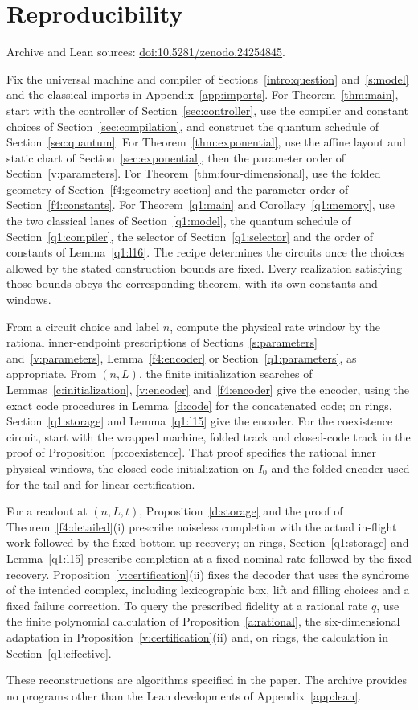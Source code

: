 \section{Reproducibility}\label{app:reproducibility}
Archive and Lean sources:
\href{https://doi.org/10.5281/zenodo.24254845}{doi:10.5281/zenodo.24254845}.

Fix the universal machine and compiler of Sections~\ref{intro:question} and~\ref{s:model}
and the classical imports in Appendix~\ref{app:imports}. For Theorem~\ref{thm:main},
start with the controller of Section~\ref{sec:controller}, use the
compiler and constant choices of Section~\ref{sec:compilation}, and
construct the quantum schedule of Section~\ref{sec:quantum}. For
Theorem~\ref{thm:exponential}, use the affine layout and static chart of
Section~\ref{sec:exponential}, then the parameter order of
Section~\ref{v:parameters}. For Theorem~\ref{thm:four-dimensional}, use the folded geometry of
Section~\ref{f4:geometry-section} and the parameter order of
Section~\ref{f4:constants}. For Theorem~\ref{q1:main} and Corollary~\ref{q1:memory}, use the two classical lanes of
Section~\ref{q1:model}, the quantum schedule of Section~\ref{q1:compiler}, the selector of
Section~\ref{q1:selector} and the order of constants of Lemma~\ref{q1:l16}. The recipe determines the circuits once
the choices allowed by the stated construction bounds are fixed.
Every realization satisfying those bounds obeys the corresponding theorem, with its own constants and windows.

From a circuit choice and label \(n\), compute the physical rate window
by the rational inner-endpoint prescriptions of
Sections~\ref{s:parameters} and~\ref{v:parameters}, Lemma~\ref{f4:encoder}
or Section~\ref{q1:parameters}, as appropriate. From \((n,L)\), the finite initialization searches of
Lemmas~\ref{c:initialization}, \ref{v:encoder} and~\ref{f4:encoder}
give the encoder, using the exact code procedures in Lemma~\ref{d:code}
for the concatenated code; on rings, Section~\ref{q1:storage} and
Lemma~\ref{q1:l15} give the encoder. For the coexistence circuit, start with
the wrapped machine, folded track and closed-code track in the proof
of Proposition~\ref{p:coexistence}. That proof specifies the rational
inner physical windows, the closed-code initialization on \(I_0\)
and the folded encoder used for the tail and for linear certification.

For a readout at \((n,L,t)\), Proposition~\ref{d:storage} and the
proof of Theorem~\ref{f4:detailed}(i) prescribe noiseless completion
with the actual in-flight work followed by the fixed bottom-up recovery;
on rings, Section~\ref{q1:storage} and Lemma~\ref{q1:l15} prescribe completion
at a fixed nominal rate followed by the fixed recovery.
Proposition~\ref{v:certification}(ii) fixes the decoder that uses the
syndrome of the intended complex, including lexicographic box, lift and filling choices and
a fixed failure correction. To query the prescribed fidelity at a
rational rate \(q\), use the finite polynomial calculation of
Proposition~\ref{a:rational}, the six-dimensional adaptation in
Proposition~\ref{v:certification}(ii) and, on rings, the calculation in
Section~\ref{q1:effective}.

These reconstructions are algorithms specified in the paper. The archive
provides no programs other than the Lean developments of
Appendix~\ref{app:lean}.
